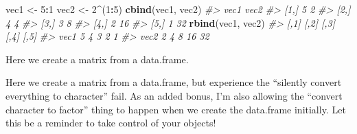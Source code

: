 \documentclass[
]{book}
\newenvironment{Shaded}{\begin{snugshade}}{\end{snugshade}}
\newcommand{\CommentTok}[1]{\textcolor[rgb]{0.56,0.35,0.01}{\textit{#1}}}
\newcommand{\DataTypeTok}[1]{\textcolor[rgb]{0.13,0.29,0.53}{#1}}
\newcommand{\DecValTok}[1]{\textcolor[rgb]{0.00,0.00,0.81}{#1}}
\newcommand{\KeywordTok}[1]{\textcolor[rgb]{0.13,0.29,0.53}{\textbf{#1}}}
\newcommand{\NormalTok}[1]{#1}
\newcommand{\OperatorTok}[1]{\textcolor[rgb]{0.81,0.36,0.00}{\textbf{#1}}}
\newcommand{\StringTok}[1]{\textcolor[rgb]{0.31,0.60,0.02}{#1}}
\begin{document}
\begin{Shaded}
\begin{Highlighting}[]
\NormalTok{vec1 <-}\StringTok{ }\DecValTok{5}\OperatorTok{:}\DecValTok{1}
\NormalTok{vec2 <-}\StringTok{ }\DecValTok{2}\OperatorTok{^}\NormalTok{(}\DecValTok{1}\OperatorTok{:}\DecValTok{5}\NormalTok{)}
\KeywordTok{cbind}\NormalTok{(vec1, vec2)}
\CommentTok{#>      vec1 vec2}
\CommentTok{#> [1,]    5    2}
\CommentTok{#> [2,]    4    4}
\CommentTok{#> [3,]    3    8}
\CommentTok{#> [4,]    2   16}
\CommentTok{#> [5,]    1   32}
\KeywordTok{rbind}\NormalTok{(vec1, vec2)}
\CommentTok{#>      [,1] [,2] [,3] [,4] [,5]}
\CommentTok{#> vec1    5    4    3    2    1}
\CommentTok{#> vec2    2    4    8   16   32}
\end{Highlighting}
\end{Shaded}

Here we create a matrix from a data.frame.

\begin{Shaded}
\end{Shaded}

Here we create a matrix from a data.frame, but experience the ``silently convert everything to character'' fail. As an added bonus, I'm also allowing the ``convert character to factor'' thing to happen when we create the data.frame initially. Let this be a reminder to take control of your objects!
\end{document}

